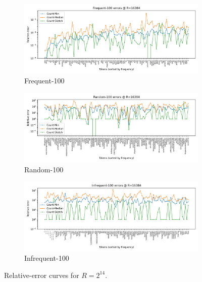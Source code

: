 \documentclass[11pt]{article}
\begin{document}
\begin{figure}[H]
  \centering
  \begin{subfigure}[t]{0.32\linewidth}
    \centering
    \includegraphics[width=\linewidth]{../outputs/a2/errors_R16384_Frequent_100.png}
    \caption{Frequent-100}
  \end{subfigure}\hfill
  \begin{subfigure}[t]{0.32\linewidth}
    \centering
    \includegraphics[width=\linewidth]{../outputs/a2/errors_R16384_Random_100.png}
    \caption{Random-100}
  \end{subfigure}\hfill
  \begin{subfigure}[t]{0.32\linewidth}
    \centering
    \includegraphics[width=\linewidth]{../outputs/a2/errors_R16384_Infrequent_100.png}
    \caption{Infrequent-100}
  \end{subfigure}
  \caption{Relative-error curves for $R=2^{14}$.}
  \label{fig:error-r16384}
\end{figure}
\end{document}
